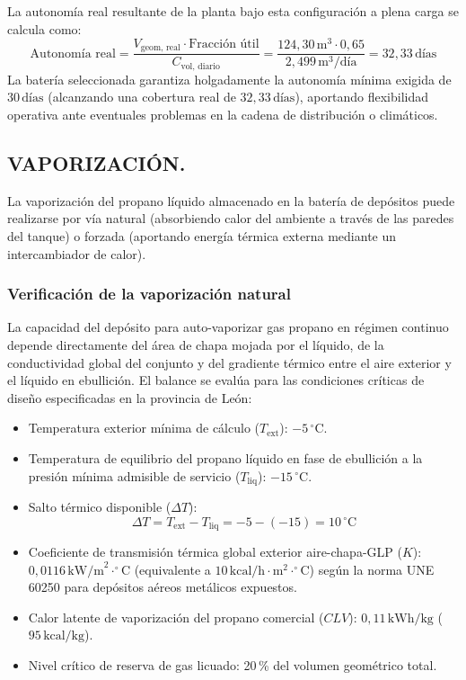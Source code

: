 \documentclass[12pt]{article}
\begin{document}
        La autonomía real resultante de la planta bajo esta configuración a plena carga se calcula como:
        \begin{equation}
            \text{Autonomía real} = \frac{V_{\text{geom, real}} \cdot \text{Fracción útil}}{C_{\text{vol, diario}}} = \frac{124,30\,\text{m}^3 \cdot 0,65}{2,499\,\text{m}^3/\text{día}} = 32,33\,\text{días}
        \end{equation}
        La batería seleccionada garantiza holgadamente la autonomía mínima exigida de $30\,\text{días}$ (alcanzando una cobertura real de $32,33\,\text{días}$), aportando flexibilidad operativa ante eventuales problemas en la cadena de distribución o climáticos.

        \subsection{VAPORIZACIÓN.}
        \label{sub:vaporizacion}
        La vaporización del propano líquido almacenado en la batería de depósitos puede realizarse por vía natural (absorbiendo calor del ambiente a través de las paredes del tanque) o forzada (aportando energía térmica externa mediante un intercambiador de calor). 

        \subsubsection{Verificación de la vaporización natural}
        La capacidad del depósito para auto-vaporizar gas propano en régimen continuo depende directamente del área de chapa mojada por el líquido, de la conductividad global del conjunto y del gradiente térmico entre el aire exterior y el líquido en ebullición. El balance se evalúa para las condiciones críticas de diseño especificadas en la provincia de León:
        \begin{itemize}
            \item Temperatura exterior mínima de cálculo ($T_{\text{ext}}$): $-5\,^{\circ}\text{C}$.
            \item Temperatura de equilibrio del propano líquido en fase de ebullición a la presión mínima admisible de servicio ($T_{\text{liq}}$): $-15\,^{\circ}\text{C}$.
            \item Salto térmico disponible ($\Delta T$): 
            \begin{equation}
                \Delta T = T_{\text{ext}} - T_{\text{liq}} = -5 - (-15) = 10\,^{\circ}\text{C}
            \end{equation}
            \item Coeficiente de transmisión térmica global exterior aire-chapa-GLP ($K$): $0,0116\,\text{kW/m}^2\cdot^{\circ}\text{C}$ (equivalente a $10\,\text{kcal/h}\cdot\text{m}^2\cdot^{\circ}\text{C}$) según la norma UNE 60250 \cite{une60250} para depósitos aéreos metálicos expuestos.
            \item Calor latente de vaporización del propano comercial ($CLV$): $0,11\,\text{kWh/kg}$ ($95\,\text{kcal/kg}$).
            \item Nivel crítico de reserva de gas licuado: 20\,\% del volumen geométrico total.
        \end{itemize}
\end{document}
